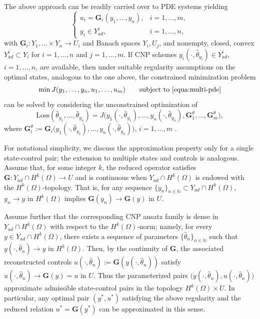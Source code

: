 \documentclass{article}
\numberwithin{equation}{section}
\begin{document}
The above approach can be readily carried over to PDE systems yielding
\begin{equation}\label{equa:multi-pde}
    \begin{cases}
        u_i=\mathbf{G}_i(y_1,\dots,y_n), & i=1,\dots,m,\\
        y_i\in Y_{ad}^i, & i=1,\dots,n,
    \end{cases}
\end{equation}
with $\mathbf{G}_i:Y_1,\ldots\times Y_n\to U_i$ and Banach spaces $Y_i, U_j$, and nonempty, closed, convex $Y_{ad}^i\subset Y_i$ for $i=1,\ldots,n$ and $j=1,\ldots,m$. If CNP schemes
$y_i(\cdot,\hat\theta_{y_i})\in Y_{ad}^i$,
$i=1,\dots,n$,
are available, then under suitable regularity assumptions on the optimal states, analogous to the one above, the constrained minimization problem
\begin{equation}
    \min J(y_1,\dots,y_n,u_1,\dots,u_m)
    \qquad
    \text{subject to \eqref{equa:multi-pde}}
\end{equation}
can be solved by considering the unconstrained optimization of
\begin{equation}
    \mathrm{Loss}(\hat\theta_{y_1},\dots,\hat\theta_{y_n})
    =
    J\bigl(
    y_1(\cdot,\hat\theta_{y_1}),
    \dots,
    y_n(\cdot,\hat\theta_{y_n}),
    \mathbf{G}_1^\theta,
    \dots,
    \mathbf{G}_m^\theta
    \bigr),
\end{equation}
where
$\mathbf{G}_i^\theta
:=
\mathbf{G}_i\bigl(
y_1(\cdot,\hat\theta_{y_1}),
\dots,
y_n(\cdot,\hat\theta_{y_n})
\bigr)$,
$i=1,\dots,m$
.

For notational simplicity, we discuss the approximation property only for a single
state-control pair; the extension to multiple states and controls is analogous.
Assume that, for some integer $k$, the reduced operator satisfies
$\mathbf{G}:Y_{ad}\cap H^k(\Omega)\to U$ and is continuous when
$Y_{ad}\cap H^k(\Omega)$ is endowed with the $H^k(\Omega)$-topology. That is, for
any sequence $\{y_n\}_{n\in\mathbb N}\subset Y_{ad}\cap H^k(\Omega)$,
$y_n\to y$ in $H^k(\Omega)$ implies $\mathbf{G}(y_n)\to \mathbf{G}(y)$ in $U$.

Assume further that the corresponding CNP ansatz family is dense in
$Y_{ad}\cap H^k(\Omega)$ with respect to the $H^k(\Omega)$-norm; namely, for
every $y\in Y_{ad}\cap H^k(\Omega)$, there exists a sequence of parameters
$\{\hat\theta_n\}_{n\in\mathbb N}$ such that
$y(\cdot,\hat\theta_n)\to y$ in $H^k(\Omega)$. Then, by the continuity of
$\mathbf{G}$, the associated reconstructed controls
$u(\cdot,\hat\theta_n):=\mathbf{G}(y(\cdot,\hat\theta_n))$ satisfy
$u(\cdot,\hat\theta_n)\to \mathbf{G}(y)=u$ in $U$. Thus the parameterized pairs
$\bigl(y(\cdot,\hat\theta_n),u(\cdot,\hat\theta_n)\bigr)$ approximate admissible
state-control pairs in the topology $H^k(\Omega)\times U$. In particular, any
optimal pair $(y^\ast,u^\ast)$ satisfying the above regularity and the reduced
relation $u^\ast=\mathbf{G}(y^\ast)$ can be approximated in this sense.
\end{document}
